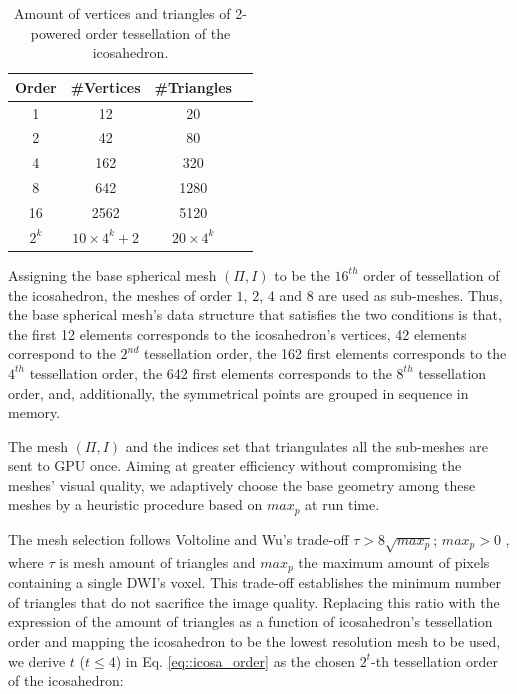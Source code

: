 \documentclass[twoside,twocolumn,10pt]{article}
\begin{document}
\begin{table}[]
\centering
\begin{tabular}{|c|c|c|c|}
\hline
\textbf{Order} & \textbf{\#Vertices} & \textbf{\#Triangles} \\ \hline
1              & 12                 & 20                  \\ \hline
2              & 42                 & 80                 \\ \hline
4              & 162                & 320                 \\ \hline
8              & 642                & 1280                \\ \hline
16             & 2562               & 5120                \\ \hline
$2^k$          & $10\times 4^k + 2$ & $20\times 4^k$           \\ \hline
\end{tabular}
\caption{Amount of vertices and triangles of 2-powered order tessellation of the icosahedron.}%
\label{tab::icosahedron_set}
\end{table}

Assigning the base spherical mesh $(\Pi, I)$ to be the $16^{th}$ order of tessellation of the icosahedron, the meshes of order $1$, $2$, $4$ and $8$ are used as sub-meshes. Thus, the base spherical mesh's data structure that satisfies the two conditions is that, the first 12 elements corresponds to the icosahedron's vertices, 42 elements correspond to the $2^{nd}$ tessellation order, the 162 first elements corresponds to the $4^{th}$ tessellation order, the 642 first elements corresponds to the $8^{th}$ tessellation order, and, additionally, the symmetrical points are grouped in sequence in memory. %

The mesh $(\Pi, I)$ and the indices set that triangulates all the sub-meshes are sent to GPU once. Aiming at greater efficiency without compromising the meshes' visual quality, we adaptively choose the base geometry among these meshes by a heuristic procedure based on $max_p$ at run time.

The mesh selection follows Voltoline and Wu's trade-off $\tau > 8\sqrt{max_p}$; $max_p > 0$ \cite{voltoline2021}, where $\tau$ is mesh amount of triangles and $max_p$ the maximum amount of pixels containing a single DWI's voxel. This trade-off establishes the minimum number of triangles that do not sacrifice the image quality. Replacing this ratio with the expression of the amount of triangles as a function of icosahedron's tessellation order and mapping the icosahedron to be the lowest resolution mesh to be used, we derive $t$ ($t \leq 4$) in Eq. \ref{eq::icosa_order} as the chosen $2^{t}$-th tessellation order of the icosahedron:
\end{document}
